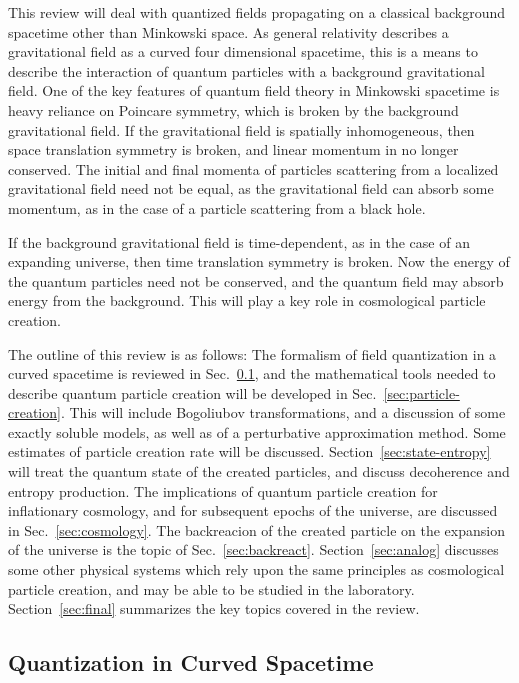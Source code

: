 \documentclass[12pt,onecolumn,eqsecnum,floats,aps,prd,floatfix,titlepage,tightenlines]{revtex4-2}
\begin{document}
This review will deal with quantized fields propagating on a classical background spacetime other than Minkowski
space. As general relativity describes a gravitational field as a curved four dimensional spacetime, this is a means
to describe the interaction of quantum particles with a background  gravitational field. One of the key features of
quantum field theory in Minkowski spacetime is heavy reliance on Poincare symmetry, which is broken by the
background  gravitational field. If the gravitational field is spatially inhomogeneous, then space translation symmetry
is broken, and linear momentum in no longer conserved. The initial and final momenta of particles scattering from
a localized gravitational field need not be equal, as the gravitational field can absorb some momentum, as in the case 
of a particle scattering from a black hole.  

If the background gravitational field is time-dependent, as in the case of an expanding universe, then time translation
symmetry is broken. Now the energy of the quantum particles need not be conserved, and the quantum field may
absorb energy from the background. This will play a key role in cosmological particle creation.

The outline of this review is as follows: The formalism of field quantization in a curved spacetime is reviewed in
Sec.~\ref{sec:quantization}, and the mathematical tools needed to describe quantum particle creation will be developed
in Sec.~\ref{sec:particle-creation}. This will include Bogoliubov transformations, and a discussion of some exactly
soluble models, as well as of a perturbative approximation method. Some estimates of particle creation rate will be
discussed. Section~\ref{sec:state-entropy} will treat the quantum state of the created particles, and discuss decoherence
and entropy production. The implications of quantum particle creation for inflationary cosmology, and for subsequent epochs
of the universe, are discussed in Sec.~\ref{sec:cosmology}. The backreacion of the created particle on the expansion of
the universe is the topic of Sec.~\ref{sec:backreact}. Section~\ref{sec:analog} discusses some other physical systems
which rely upon the same principles as cosmological particle creation, and may be able to be studied in the laboratory.
Section~\ref{sec:final} summarizes the key topics covered in the review.




\subsection{Quantization in Curved Spacetime}
\label{sec:quantization}
\end{document}
